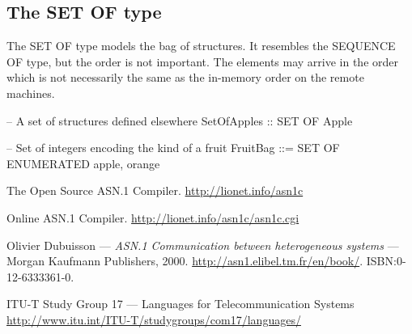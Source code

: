 \documentclass[english,oneside,12pt]{book}
\begin{document}
\subsection{The SET OF type}

The SET OF type models the bag of structures. It resembles the SEQUENCE
OF type, but the order is not important. The elements may arrive
in the order which is not necessarily the same as the in-memory order
on the remote machines.
\begin{asn}
-- A set of structures defined elsewhere
SetOfApples :: SET OF Apple

-- Set of integers encoding the kind of a fruit
FruitBag ::= SET OF ENUMERATED { apple, orange }
\end{asn}
\begin{thebibliography}{ITU-T/ASN.1}
The Open Source ASN.1 Compiler. \url{http://lionet.info/asn1c}

Online ASN.1 Compiler. \url{http://lionet.info/asn1c/asn1c.cgi}

Olivier Dubuisson --- \emph{ASN.1 Communication
between heterogeneous systems} --- Morgan Kaufmann Publishers, 2000.
\url{http://asn1.elibel.tm.fr/en/book/}. ISBN:0-12-6333361-0.

ITU-T Study Group 17 --- Languages
for Telecommunication Systems \url{http://www.itu.int/ITU-T/studygroups/com17/languages/}
\end{thebibliography}
\end{document}
